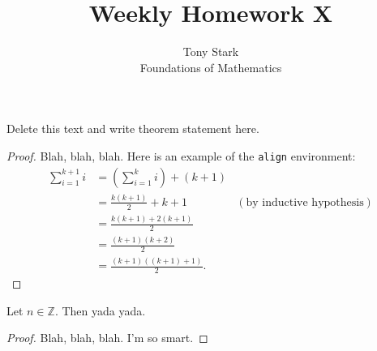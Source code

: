 \documentclass[12pt]{article}
\newcommand{\Z}{\mathbb{Z}}
\newenvironment{theorem}[2][Theorem]{\begin{trivlist}
\item[\hskip \labelsep {\bfseries #1}\hskip \labelsep {\bfseries #2.}]}{\end{trivlist}}
\begin{document}
 
 
\title{Weekly Homework X}%
\author{Tony Stark\\ %
Foundations of Mathematics} %
 
\maketitle
 
\begin{theorem}{x.yz} %
Delete this text and write theorem statement here.
\end{theorem}
 
\begin{proof} %
Blah, blah, blah.  Here is an example of the \texttt{align} environment:
\begin{align*}
\sum_{i=1}^{k+1}i & = \left(\sum_{i=1}^{k}i\right) +(k+1)\\ 
& = \frac{k(k+1)}{2}+k+1 & (\text{by inductive hypothesis})\\
& = \frac{k(k+1)+2(k+1)}{2}\\
& = \frac{(k+1)(k+2)}{2}\\
& = \frac{(k+1)((k+1)+1)}{2}.
\end{align*}
\end{proof}
 
\begin{theorem}{x.yz}
Let $n\in \Z$.  Then yada yada.
\end{theorem}
 
\begin{proof}
Blah, blah, blah.  I'm so smart.
\end{proof}
 
 
\end{document}

